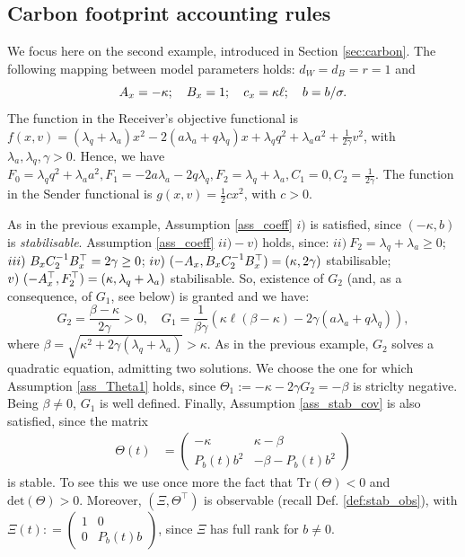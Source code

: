 \documentclass[a4paper,10pt]{article}
\theoremstyle{definition}
\theoremstyle{plain}
\numberwithin{equation}{section}
\begin{document}
\subsection{Carbon footprint accounting rules}\label{app_ex_2}

We focus here on the second example, introduced in Section \ref{sec:carbon}. The following mapping between model parameters holds: $d_W = d_B = r=1$ and
$$
A_{\rm x} = - \kappa; \quad  B_{\rm x}  = 1 ; \quad  c_{\rm x} =  \kappa \ell; \quad b= b/\sigma.
$$
The function in the Receiver's objective functional is $f(x,v) = (\lambda_q + \lambda_a)x^2  -2 ( a \lambda_a + q \lambda_q) x +\lambda_q q^2 + \lambda_a a^2+ \frac{1}{2\gamma} {v^2}$, with $\lambda_a, \lambda_q,\gamma >0$. Hence, we have $F_0 = \lambda_q q^2 + \lambda_a a^2, F_1 = -2 a \lambda_a - 2 q \lambda_q , F_2 = \lambda_q + \lambda_a, C_1=0, C_2= \frac{1}{2 \gamma}$. 
The function in the Sender functional is $g(x,v) = \frac12 c x^2$, with $c >0$.

As in the previous example, Assumption \ref{ass_coeff} $i)$ is satisfied, since $(- \kappa, b)$ is \emph{stabilisable}. 
Assumption \ref{ass_coeff} $ii)-v)$ holds, since: $ii) \ F_2 = \lambda_q + \lambda_a  \ge 0$; $iii) \  B_{\rm x} C_2^{-1} B_{\rm x}^\top = 2 \gamma \ge 0$;
$iv)\  (-A_{\rm x}, B_{\rm x} C_2^{-1} B_{\rm x}^\top) = (\kappa, 2 \gamma)$ stabilisable; $v) \  (-A_{\rm x}^\top,F_2^\top) = (\kappa, \lambda_q + \lambda_a) $ stabilisable.
So, existence of $G_2$ (and, as a consequence, of $G_1$, see below) is granted and we have:
$$
G_2 = \frac{\beta - \kappa}{2 \gamma} >0, \quad G_1 = \frac{1}{\beta \gamma} \left( \kappa \ell (\beta - \kappa) - 2 \gamma (a \lambda_a +  q \lambda_q) \right),
$$
where $\beta = \sqrt{\kappa^2 + 2 \gamma ( \lambda_q + \lambda_a)} > \kappa$. As in the previous example, $G_2$ solves a quadratic equation, admitting two solutions. We choose the one for which  Assumption \ref{ass_Theta1} holds,  since $\Theta_1 := - \kappa - 2 \gamma G_2 = - \beta $ is striclty negative.
Being $\beta \neq 0$, $G_1$ is well defined.
Finally, Assumption \ref{ass_stab_cov} is also satisfied, since the matrix
\begin{align*}  \Theta(t) & =
\begin{pmatrix}
        -\kappa  & \kappa - \beta\\
        P_b(t) b^2 & -\beta -  P_b(t)b^2
    \end{pmatrix}
    \end{align*} 
is stable. To see this we use once more the fact that $\textrm{Tr}(\Theta) <0$ and $\textrm{det}(\Theta)>0$. 
Moreover, $(\Xi, \Theta^\top )$ is observable (recall Def. \ref{def:stab_obs}), with $\Xi(t) : =
    \begin{pmatrix}
        1 &  0\\
         0 & P_b(t)b 
    \end{pmatrix}$, since $\Xi$ has full rank for $b \neq 0$.
\end{document}
